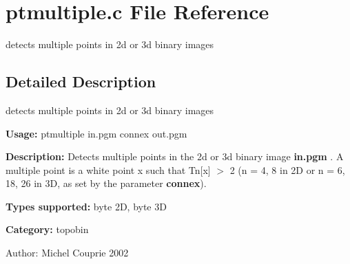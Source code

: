 \section{ptmultiple.c File Reference}
\label{ptmultiple_8c}
detects multiple points in 2d or 3d binary images 



\subsection{Detailed Description}
detects multiple points in 2d or 3d binary images 

{\bf Usage:} ptmultiple in.pgm connex out.pgm

{\bf Description:} Detects multiple points in the 2d or 3d binary image {\bf in.pgm} . A multiple point is a white point x such that Tn[x] $>$ 2 (n = 4, 8 in 2D or n = 6, 18, 26 in 3D, as set by the parameter {\bf connex}).

{\bf Types supported:} byte 2D, byte 3D

{\bf Category:} topobin

\begin{Desc}
\item[Author:]Michel Couprie 2002 \end{Desc}
